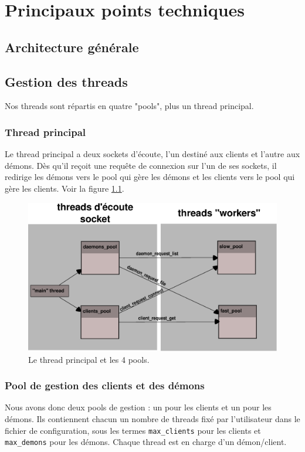 \chapter{Principaux points techniques}


\section{Architecture générale}




\section{Gestion des threads}
\label{threads_by_pools}
Nos threads sont répartis en quatre "pools", plus un thread principal.


\subsection{Thread principal}
Le thread principal a deux sockets d'écoute, l'un destiné aux clients et
l'autre aux démons. Dès qu'il reçoit une requête de connexion sur l'un de
ses sockets, il redirige les démons vers le pool qui gère les démons et
les clients vers le pool qui gère les clients. Voir la figure \ref{interaction}.
\begin{center}
\begin{figure}[htbp]
    \centering
    \includegraphics[scale=0.3]{pools_interacting.eps}
    \caption{Le thread principal et les 4 pools.}
    \label{interaction}
\end{figure}
\end{center}


\subsection{Pool de gestion des clients et des démons}
Nous avons donc deux pools de gestion : un pour les clients et un pour
les démons. Ils contiennent chacun un nombre de threads fixé par
l'utilisateur dans le fichier de configuration, sous les termes 
\verb$max_clients$ pour les clients et \verb$max_demons$ pour les démons.
Chaque thread est en charge d'un démon/client.

